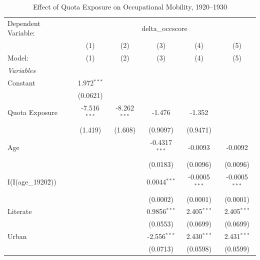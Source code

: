 
\begin{table}[htbp]
   \caption{\label{tab:main} Effect of Quota Exposure on Occupational Mobility, 1920--1930}
   \centering
   \begin{tabular}{lccccc}
      \tabularnewline \midrule \midrule
      Dependent Variable: & \multicolumn{5}{c}{delta\_occscore}\\
                             & (1)            & (2)            & (3)             & (4)             & (5) \\   
      Model:                 & (1)            & (2)            & (3)             & (4)             & (5)\\  
      \midrule
      \emph{Variables}\\
      Constant               & 1.972$^{***}$  &                &                 &                 &   \\   
                             & (0.0621)       &                &                 &                 &   \\   
      Quota Exposure         & -7.516$^{***}$ & -8.262$^{***}$ & -1.476          & -1.352          &   \\   
                             & (1.419)        & (1.608)        & (0.9097)        & (0.9471)        &   \\   
      Age                    &                &                & -0.4317$^{***}$ & -0.0093         & -0.0092\\   
                             &                &                & (0.0183)        & (0.0096)        & (0.0096)\\   
      I(I(age\_1920\^2))     &                &                & 0.0044$^{***}$  & -0.0005$^{***}$ & -0.0005$^{***}$\\   
                             &                &                & (0.0002)        & (0.0001)        & (0.0001)\\   
      Literate               &                &                & 0.9856$^{***}$  & 2.405$^{***}$   & 2.405$^{***}$\\   
                             &                &                & (0.0553)        & (0.0699)        & (0.0699)\\   
      Urban                  &                &                & -2.556$^{***}$  & 2.430$^{***}$   & 2.431$^{***}$\\   
                             &                &                & (0.0713)        & (0.0598)        & (0.0599)\\   

\end{tabular}
\end{table}
